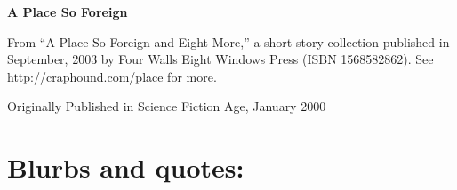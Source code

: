 


\newenvironment{authorof}{\begin{flushright}\sffamily}{\end{flushright}}


\begin{center}
\textbf{\huge\textsf{{A Place So Foreign}}}
\end{center}


From ``A Place So Foreign and Eight More,'' a short story
collection published in September, 2003 by Four Walls Eight Windows
Press (ISBN 1568582862). See http://craphound.com/place for more.

Originally Published in Science Fiction Age, January 2000


\section{Blurbs and quotes:}

